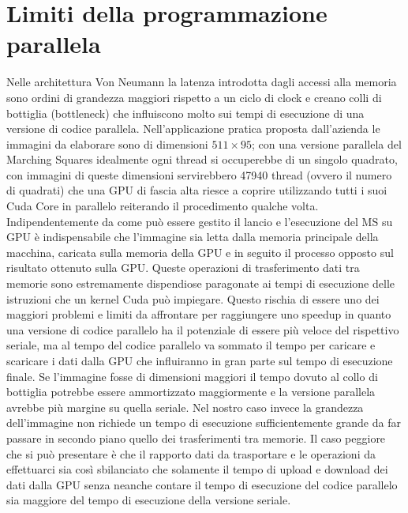 \documentclass[12pt,a4paper]{report}
\begin{document}
\newpage
\section{Limiti della programmazione parallela}
Nelle architettura Von Neumann la latenza introdotta dagli accessi alla memoria sono ordini di grandezza maggiori rispetto a un ciclo di clock e creano colli di bottiglia (bottleneck) che influiscono molto sui tempi di esecuzione di una versione di codice parallela.
Nell'applicazione pratica proposta dall'azienda le immagini da elaborare sono di dimensioni $511\times 95$; con una versione parallela del Marching Squares idealmente ogni thread si occuperebbe di un singolo quadrato, con immagini di queste dimensioni servirebbero 47940 thread (ovvero il numero di quadrati) che una GPU di fascia alta riesce a coprire utilizzando tutti i suoi Cuda Core in parallelo reiterando il procedimento qualche volta. \newline
Indipendentemente da come può essere gestito il lancio e l'esecuzione del MS su GPU è indispensabile che l'immagine sia letta dalla memoria principale della macchina, caricata sulla memoria della GPU e in seguito il processo opposto sul risultato ottenuto sulla GPU.
Queste operazioni di trasferimento dati tra memorie sono estremamente dispendiose paragonate ai tempi di esecuzione delle istruzioni che un kernel Cuda può impiegare.
Questo rischia di essere uno dei maggiori problemi e limiti da affrontare per raggiungere uno speedup in quanto una versione di codice parallelo ha il potenziale di essere più veloce del rispettivo seriale, ma al tempo del codice parallelo va sommato il tempo per caricare e scaricare i dati dalla GPU che influiranno in gran parte sul tempo di esecuzione finale. \newline
Se l'immagine fosse di dimensioni maggiori il tempo dovuto al collo di bottiglia potrebbe essere ammortizzato maggiormente e la versione parallela avrebbe più margine su quella seriale. Nel nostro caso invece la grandezza dell'immagine non richiede un tempo di esecuzione sufficientemente grande da far passare in secondo piano quello dei trasferimenti tra memorie. \newline
Il caso peggiore che si può presentare è che il rapporto dati da trasportare e le operazioni da effettuarci sia così sbilanciato che solamente il tempo di upload e download dei dati dalla GPU senza neanche contare il tempo di esecuzione del codice parallelo sia maggiore del tempo di esecuzione della versione seriale.
\newpage
\end{document}
